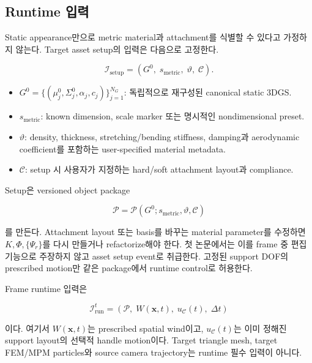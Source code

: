 \documentclass[11pt,a4paper]{article}
\begin{document}
\subsection{Runtime 입력}

Static appearance만으로 metric material과 attachment를 식별할 수 있다고 가정하지 않는다.
Target asset setup의 입력은 다음으로 고정한다.

\begin{equation}
  \mathcal I_{\mathrm{setup}}
  =
  \left(
    G^0,\;
    s_{\mathrm{metric}},\;
    \vartheta,\;
    \mathcal C
  \right).
\end{equation}

\begin{itemize}[leftmargin=1.5em]
  \item \(G^0=\{(\mu_j^0,\Sigma_j^0,\alpha_j,c_j)\}_{j=1}^{N_G}\):
  독립적으로 재구성된 canonical static 3DGS.
  \item \(s_{\mathrm{metric}}\): known dimension, scale marker 또는 명시적인 nondimensional preset.
  \item \(\vartheta\): density, thickness, stretching/bending stiffness, damping과 aerodynamic coefficient를 포함하는
  user-specified material metadata.
  \item \(\mathcal C\): setup 시 사용자가 지정하는 hard/soft attachment layout과 compliance.
\end{itemize}

Setup은 versioned object package

\begin{equation}
  \mathcal P
  =
  \mathcal P(G^0;s_{\mathrm{metric}},\vartheta,\mathcal C)
\end{equation}

를 만든다. Attachment layout 또는 basis를 바꾸는 material parameter를 수정하면
\(K,\Phi,\{\Psi_r\}\)를 다시 만들거나 refactorize해야 한다.
첫 논문에서는 이를 frame 중 편집 기능으로 주장하지 않고 asset setup event로 취급한다.
고정된 support DOF의 prescribed motion만 같은 package에서 runtime control로 허용한다.

Frame runtime 입력은

\begin{equation}
  \mathcal I_{\mathrm{run}}^t
  =
  \left(
    \mathcal P,\;
    W(\mathbf x,t),\;
    u_{\mathcal C}(t),\;
    \Delta t
  \right)
\end{equation}

이다. 여기서 \(W(\mathbf x,t)\)는 prescribed spatial wind이고,
\(u_{\mathcal C}(t)\)는 이미 정해진 support layout의 선택적 handle motion이다.
Target triangle mesh, target FEM/MPM particles와 source camera trajectory는 runtime 필수 입력이 아니다.
\end{document}
